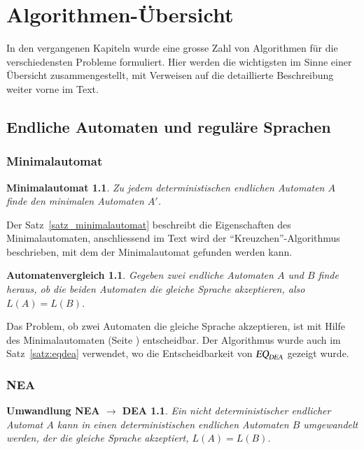 \chapter{Algorithmen-Übersicht\label{skript:algorithmen}}
\rhead{}
In den vergangenen Kapiteln wurde eine grosse Zahl von Algorithmen
für die verschiedensten Probleme formuliert.
Hier werden die wichtigsten im Sinne einer Übersicht zusammengestellt,
mit Verweisen auf die detaillierte Beschreibung weiter vorne im Text.
\section{Endliche Automaten und reguläre Sprachen}
\subsection{Minimalautomat}
\newtheorem*{Minimalautomat}{Minimalautomat}
\begin{Minimalautomat}
Zu jedem deterministischen endlichen Automaten $A$ finde den minimalen
Automaten $A'$.
\end{Minimalautomat}
Der Satz~\ref{satz_minimalautomat} beschreibt die Eigenschaften des
Minimalautomaten, anschliessend im Text wird der ``Kreuzchen''-Algorithmus
beschrieben, mit dem der Minimalautomat gefunden werden kann.

\newtheorem*{Automatenvergleich}{Automatenvergleich}
\begin{Automatenvergleich}
Gegeben zwei endliche Automaten $A$ und $B$ finde heraus, ob die
beiden Automaten die gleiche Sprache akzeptieren, also $L(A)=L(B)$.
\end{Automatenvergleich}
Das Problem, ob zwei Automaten die gleiche Sprache akzeptieren,
ist mit Hilfe des Minimalautomaten (Seite \pageref{algorithmus:minimalautomat})
entscheidbar.
Der Algorithmus wurde auch im Satz~\ref{satz:eqdea} verwendet, wo die
Entscheidbarkeit von $\textsl{EQ}_\textsl{DEA}$ gezeigt wurde.


\subsection{NEA}
\newtheorem*{NEA}{Umwandlung NEA $\to$ DEA}
\begin{NEA}
Ein nicht deterministischer endlicher Automat $A$ kann in einen 
deterministischen endlichen Automaten $B$ umgewandelt werden, der die
gleiche Sprache akzeptiert, $L(A)=L(B)$.
\end{NEA}

